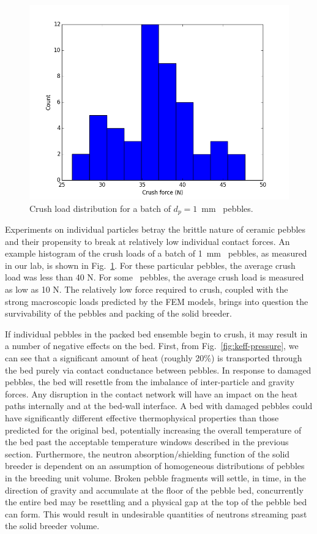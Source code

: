 

\begin{figure}[ht]
	\centering
	\includegraphics[width=\singleimagewidth]{chapters/figures/fmax} 
	\caption{Crush load distribution for a batch of $d_p = 1$~mm \lit~pebbles.}
	\label{fig:fmax}
\end{figure}


Experiments on individual particles betray the brittle nature of ceramic pebbles and their propensity to break at relatively low individual contact forces. An example histogram of the crush loads of a batch of 1~mm \lit~pebbles, as measured in our lab, is shown in Fig.~\ref{fig:fmax}. For these particular pebbles, the average crush load was less than 40 N. For some \lis~pebbles, the average crush load is measured as low as 10 N. The relatively low force required to crush, coupled with the strong macroscopic loads predicted by the FEM models, brings into question the survivability of the pebbles and packing of the solid breeder.

If individual pebbles in the packed bed ensemble begin to crush, it may result in a number of negative effects on the bed. First, from Fig.~\ref{fig:keff-pressure}, we can see that a significant amount of heat (roughly 20\%) is transported through the bed purely via contact conductance between pebbles. In response to damaged pebbles, the bed will resettle from the imbalance of inter-particle and gravity forces. Any disruption in the contact network will have an impact on the heat paths internally and at the bed-wall interface. A bed with damaged pebbles could have significantly different effective thermophysical properties than those predicted for the original bed, potentially increasing the overall temperature of the bed past the acceptable temperature windows described in the previous section. Furthermore, the neutron absorption/shielding function of the solid breeder is dependent on an assumption of homogeneous distributions of pebbles in the breeding unit volume. Broken pebble fragments will settle, in time, in the direction of gravity and accumulate at the floor of the pebble bed, concurrently the entire bed may be resettling and a physical gap at the top of the pebble bed can form. This would result in undesirable quantities of neutrons streaming past the solid breeder volume. 

